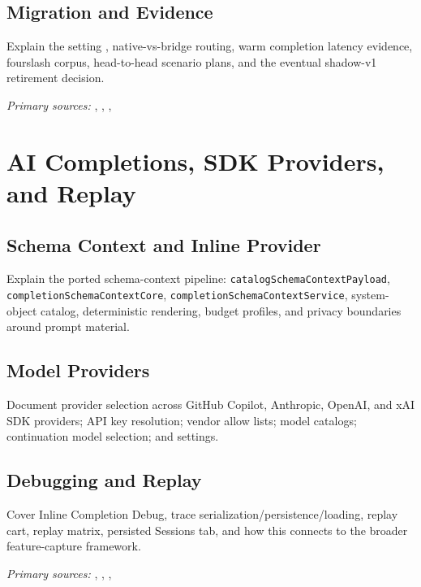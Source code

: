 \documentclass[11pt]{article}
\newcommand{\code}[1]{\texttt{#1}}
\begin{document}
\subsection{Migration and Evidence}

Explain the setting , native-vs-bridge routing, warm completion latency evidence, fourslash corpus, head-to-head scenario plans, and the eventual shadow-v1 retirement decision.

\noindent\textit{Primary sources:} , , , 

\section{AI Completions, SDK Providers, and Replay}

\subsection{Schema Context and Inline Provider}

Explain the ported schema-context pipeline: \code{catalogSchemaContextPayload}, \code{completionSchemaContextCore}, \code{completionSchemaContextService}, system-object catalog, deterministic rendering, budget profiles, and privacy boundaries around prompt material.

\subsection{Model Providers}

Document provider selection across GitHub Copilot, Anthropic, OpenAI, and xAI SDK providers; API key resolution; vendor allow lists; model catalogs; continuation model selection; and settings.

\subsection{Debugging and Replay}

Cover Inline Completion Debug, trace serialization/persistence/loading, replay cart, replay matrix, persisted Sessions tab, and how this connects to the broader feature-capture framework.

\noindent\textit{Primary sources:} , , , 
\end{document}
